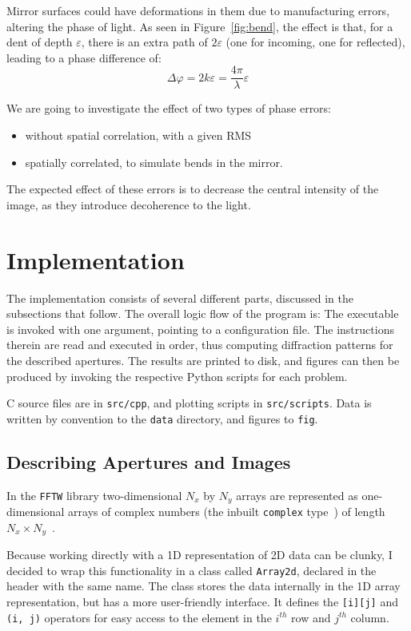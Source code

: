 \documentclass[11pt]{article}
\newcommand{\eps}{\varepsilon}
\newcommand{\ph}{\varphi}
\newcommand{\CC}{{C\nolinebreak[4]\hspace{-.05em}\raisebox{.3ex}{\scriptsize\bf ++}}}
\begin{document}
Mirror surfaces could have deformations in them due to manufacturing errors, altering the phase of light. As seen in Figure~\ref{fig:bend}, the effect is that, for a dent of depth $\eps$, there is an extra path of $2\eps$ (one for incoming, one for reflected), leading to a phase difference of:
\begin{equation}
    \Delta\ph = 2k\eps = \frac{4\pi}{\lambda}\eps
\end{equation}

We are going to investigate the effect of two types of phase errors:
\begin{itemize}
    \item without spatial correlation, with a given RMS
    \item spatially correlated, to simulate bends in the mirror.
\end{itemize}

The expected effect of these errors is to decrease the central intensity of the image, as they introduce decoherence to the light.

\section{Implementation}\label{sec:impl}
The implementation consists of several different parts, discussed in the subsections that follow. The overall logic flow of the program is:
The executable is invoked with one argument, pointing to a configuration file. The instructions therein are read and executed in order, thus computing diffraction patterns for the described apertures. The results are printed to disk, and figures can then be produced by invoking the respective Python scripts for each problem.

\CC{} source files are in \texttt{src/cpp}, and plotting scripts in \texttt{src/scripts}. Data is written by convention to the \texttt{data} directory, and figures to \texttt{fig}.

\subsection{Describing Apertures and Images}
In the \texttt{FFTW} library two-dimensional $N_x$ by $N_y$ arrays are represented as one-dimensional arrays of complex numbers (the inbuilt \texttt{complex} type~\cite{cppcomplex}) of length $N_x \times N_y$~\cite[Section 3.2]{fftw}.

Because working directly with a 1D representation of 2D data can be clunky, I decided to wrap this functionality in a class called \texttt{Array2d}, declared in the header with the same name. The class stores the data internally in the 1D array representation, but has a more user-friendly interface. It defines the \texttt{[i][j]} and \texttt{(i, j)} operators for easy access to the element in the $i^{th}$ row and $j^{th}$ column.
\end{document}
